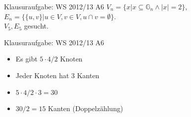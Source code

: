 \begin{frame}{Klausuraufgabe: WS 2012/13 A6}
  $V_n=\{x|x\subseteq\mathbb{G}_n\land |x|=2\}$,\\
  $E_n=\{\{u,v\}|u\in V,v\in V,u\cap v=\emptyset\}$.\\
  $V_5,E_5$ gesucht.
  \pause
  \begin{center}
  \end{center}
\end{frame}

\begin{frame}{Klausuraufgabe: WS 2012/13 A6}
  \begin{itemize}
    \item Es gibt $5\cdot 4/2$ Knoten
    \item Jeder Knoten hat 3 Kanten
    \item $5\cdot 4/2 \cdot 3=30$
    \item $30/2=15$ Kanten (Doppelzählung)
  \end{itemize}
\end{frame}
